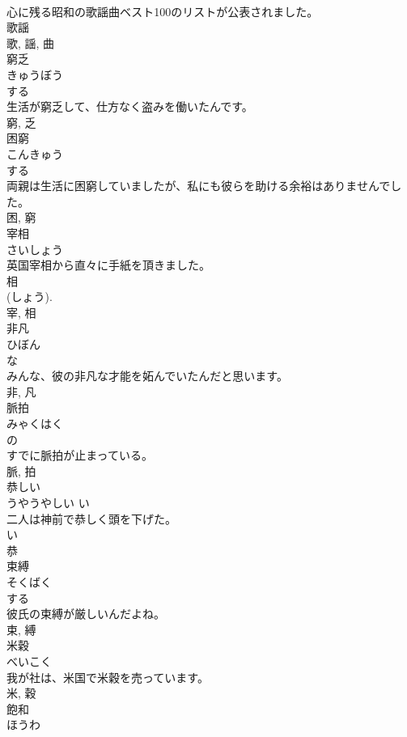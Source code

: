 \documentclass[8pt]{extreport}
\begin{document}
\begin{CJK}{UTF8}{min}
\\	心に残る昭和の歌謡曲ベスト100のリストが公表されました。	
\\	歌謡 
\\	歌, 謡, 曲	
\\	窮乏	
\\	きゅうぼう	
\\	する 
\\	生活が窮乏して、仕方なく盗みを働いたんです。	
\\	窮, 乏	
\\	困窮	
\\	こんきゅう	
\\	する 
\\	両親は生活に困窮していましたが、私にも彼らを助ける余裕はありませんでした。	
\\	困, 窮	
\\	宰相	
\\	さいしょう	
\\	英国宰相から直々に手紙を頂きました。	
\\	相 
\\	(しょう). 
\\	宰, 相	
\\	非凡	
\\	ひぼん	
\\	な 
\\	みんな、彼の非凡な才能を妬んでいたんだと思います。	
\\	非, 凡	
\\	脈拍	
\\	みゃくはく	
\\	の 
\\	すでに脈拍が止まっている。	
\\	脈, 拍	
\\	恭しい	
\\	うやうやしい	い 
\\	二人は神前で恭しく頭を下げた。	
\\	い 
\\	恭	
\\	束縛	
\\	そくばく	
\\	する 
\\	彼氏の束縛が厳しいんだよね。	
\\	束, 縛	
\\	米穀	
\\	べいこく	
\\	我が社は、米国で米穀を売っています。	
\\	米, 穀	
\\	飽和	
\\	ほうわ	

\end{CJK}
\end{document}
